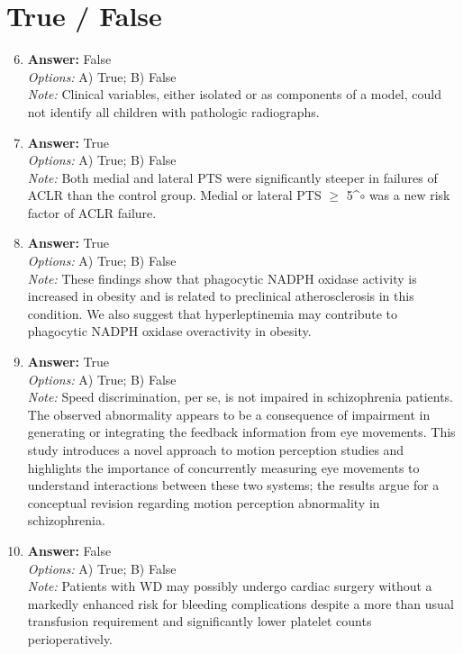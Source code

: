 \documentclass[12pt]{article}
\begin{document}
\section*{True / False}
\begin{enumerate}[label=\arabic*.]
\setcounter{enumi}{5}
\item \textbf{Answer:} False
\\ \textit{Options:} A) True; B) False
\\ \textit{Note:} Clinical variables, either isolated or as components of a model, could not identify all children with pathologic radiographs.
\item \textbf{Answer:} True
\\ \textit{Options:} A) True; B) False
\\ \textit{Note:} Both medial and lateral PTS were significantly steeper in failures of ACLR than the control group. Medial or lateral PTS \ensuremath{\geq} 5^\ensuremath{\circ} was a new risk factor of ACLR failure.
\item \textbf{Answer:} True
\\ \textit{Options:} A) True; B) False
\\ \textit{Note:} These findings show that phagocytic NADPH oxidase activity is increased in obesity and is related to preclinical atherosclerosis in this condition. We also suggest that hyperleptinemia may contribute to phagocytic NADPH oxidase overactivity in obesity.
\item \textbf{Answer:} True
\\ \textit{Options:} A) True; B) False
\\ \textit{Note:} Speed discrimination, per se, is not impaired in schizophrenia patients. The observed abnormality appears to be a consequence of impairment in generating or integrating the feedback information from eye movements. This study introduces a novel approach to motion perception studies and highlights the importance of concurrently measuring eye movements to understand interactions between these two systems; the results argue for a conceptual revision regarding motion perception abnormality in schizophrenia.
\item \textbf{Answer:} False
\\ \textit{Options:} A) True; B) False
\\ \textit{Note:} Patients with WD may possibly undergo cardiac surgery without a markedly enhanced risk for bleeding complications despite a more than usual transfusion requirement and significantly lower platelet counts perioperatively.
\end{enumerate}
\end{document}
